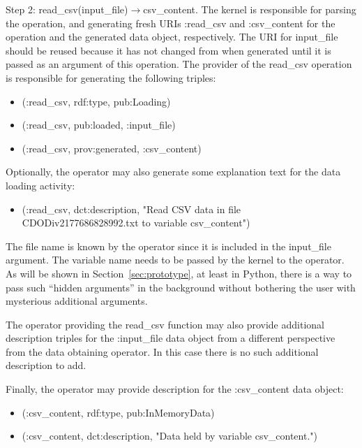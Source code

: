 Step 2: read\_csv(input\_file)$\rightarrow$csv\_content. The kernel is responsible for parsing the operation, and generating fresh URIs :read\_csv and :csv\_content for the operation and the generated data object, respectively. The URI for input\_file should be reused because it has not changed from when generated until it is passed as an argument of this operation. The provider of the read\_csv operation is responsible for generating the following triples:
\begin{itemize}
	\item (:read\_csv, rdf:type, pub:Loading)
	\item (:read\_csv, pub:loaded, :input\_file)
	\item (:read\_csv, prov:generated, :csv\_content)
\end{itemize}
Optionally, the operator may also generate some explanation text for the data loading activity:
\begin{itemize}
	\item (:read\_csv, dct:description, "Read CSV data in file CDODiv2177686828992.txt to variable csv\_content")
\end{itemize}
The file name is known by the operator since it is included in the input\_file argument. The variable name needs to be passed by the kernel to the operator. As will be shown in Section~\ref{sec:prototype}, at least in Python, there is a way to pass such ``hidden arguments'' in the background without bothering the user with mysterious additional arguments.

The operator providing the read\_csv function may also provide additional description triples for the :input\_file data object from a different perspective from the data obtaining operator. In this case there is no such additional description to add.

Finally, the operator may provide description for the :csv\_content data object:
\begin{itemize}
	\item (:csv\_content, rdf:type, pub:InMemoryData)
	\item (:csv\_content, dct:description, "Data held by variable csv\_content.")
\end{itemize}

